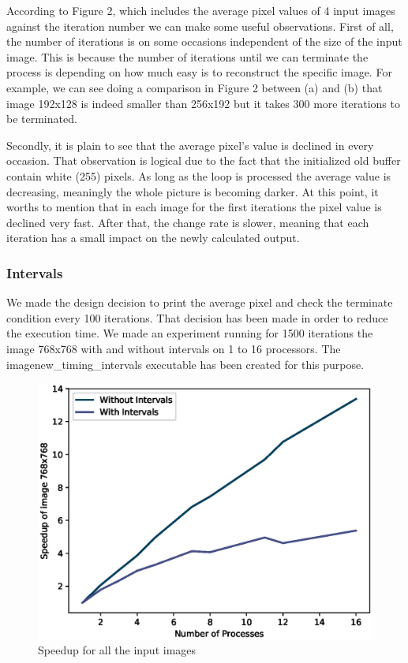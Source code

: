 \documentclass[12pt,a4paper]{article}
\begin{document}
            According to Figure 2, which includes the average pixel values of 4 input images against the iteration number we can make some useful observations. First of all, the number of iterations is on some occasions independent of the size of the input image. This is because the number of iterations until we can terminate the process is depending on how much easy is to reconstruct the specific image. For example, we can see doing a comparison in Figure 2 between  (a) and (b) that image 192x128 is indeed smaller than 256x192 but it takes 300 more iterations to be terminated.

            Secondly, it is plain to see that the average pixel's value is declined in every occasion. That observation is logical due to the fact that the initialized old buffer contain white (255) pixels. As long as the loop is processed the average value is decreasing, meaningly the whole picture is becoming darker. At this point, it worths to mention that in each image for the first iterations the pixel value is declined very fast. After that, the change rate is slower, meaning that each iteration has a small impact on the newly calculated output.

        \subsubsection{Intervals}
We made the design decision to print the average pixel and check the terminate condition every 100 iterations. That decision has been made in order to reduce the execution time. We made an experiment running for 1500 iterations the image 768x768 with and without intervals on 1 to 16 processors. The imagenew\_timing\_intervals executable has been created for this purpose.
\begin{figure}[ht]
	\centering
	\includegraphics[scale=0.6]{../graphs/speedupInterval.eps}
	\caption{Speedup for all the input images}
	\label{speedupWithInterval}
\end{figure}
\end{document}
